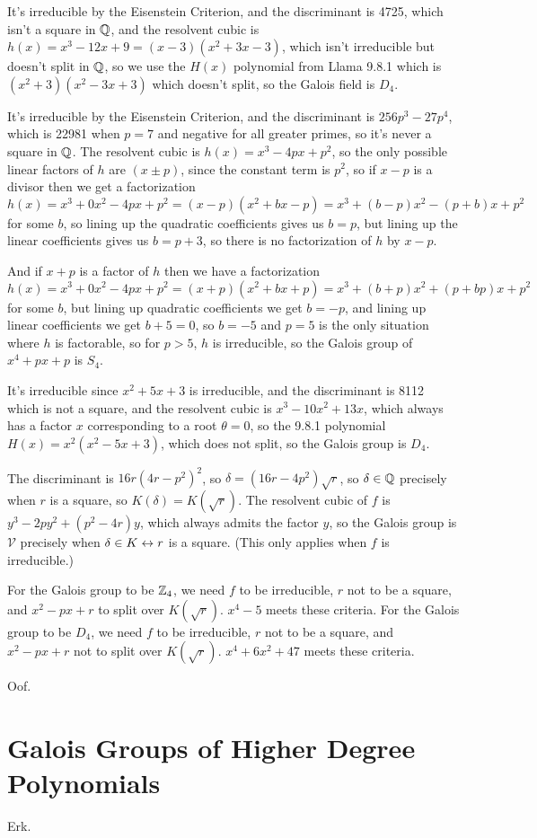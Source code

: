 \documentclass[11pt, oneside]{article}   	%
\begin{document}
\item It's irreducible by the Eisenstein Criterion, and the discriminant is 4725, which isn't a square in $\mathbb{Q}$, and the resolvent cubic is $h(x) = x^3 - 12x + 9 = (x-3)(x^2 + 3x - 3)$, which isn't irreducible but doesn't split in $\mathbb{Q}$, so we use the $H(x)$ polynomial from Llama 9.8.1 which is $(x^2 + 3)(x^2 - 3x + 3)$ which doesn't split, so the Galois field is $D_4$. 
\item It's irreducible by the Eisenstein Criterion, and the discriminant is $256p^3 - 27p^4$, which is 22981 when $p=7$ and negative for all greater primes, so it's never a square in $\mathbb{Q}$. The resolvent cubic is $h(x) = x^3 - 4px + p^2$, so the only possible linear factors of $h$ are $(x \pm p)$, since the constant term is $p^2$, so if $x-p$ is a divisor then we get a factorization $h(x) = x^3 + 0x^2 - 4px + p^2 = (x-p)(x^2 + bx - p) = x^3 + (b-p)x^2 - (p+b)x + p^2$ for some $b$, so lining up the quadratic coefficients gives us $b = p$, but lining up the linear coefficients gives us $b = p + 3$, so there is no factorization of $h$ by $x-p$.

And if $x+p$ is a factor of $h$ then we have a factorization $h(x) = x^3 + 0x^2 - 4px + p^2 = (x+p)(x^2 + bx + p) = x^3 + (b+p)x^2 + (p+bp)x + p^2$ for some $b$, but lining up quadratic coefficients we get $b = -p$, and lining up linear coefficients we get $b + 5 = 0$, so $b = -5$ and $p=5$ is the only situation where $h$ is factorable, so for $p > 5$, $h$ is irreducible, so the Galois group of $x^4 + px + p$ is $S_4$. 
\item It's irreducible since $x^2 + 5x + 3$ is irreducible, and the discriminant is 8112 which is not a square, and the resolvent cubic is $x^3 - 10x^2 + 13x$, which always has a factor $x$ corresponding to a root $\theta = 0$, so the 9.8.1 polynomial $H(x) = x^2(x^2 - 5x + 3)$, which does not split, so the Galois group is $D_4$.
\item The discriminant is $16r(4r-p^2)^2$, so $\delta = (16r-4p^2)\sqrt{r}$, so $\delta \in \mathbb{Q}$ precisely when $r$ is a square, so $K(\delta) = K(\sqrt{r})$. The resolvent cubic of $f$ is $y^3 - 2py^2 + (p^2-4r)y$, which always admits the factor $y$, so the Galois group is $\mathcal{V}$ precisely when $\delta \in K \leftrightarrow r$ is a square. (This only applies when $f$ is irreducible.)
\item For the Galois group to be $\mathbb{Z}_4$, we need $f$ to be irreducible, $r$ not to be a square, and $x^2 - px + r$ to split over $K(\sqrt{r})$. $x^4 - 5$ meets these criteria. For the Galois group to be $D_4$, we need $f$ to be irreducible, $r$ not to be a square, and $x^2 - px + r$ not to split over $K(\sqrt{r})$. $x^4 + 6x^2 + 47$ meets these criteria.
\item Oof.
\ee
\section{Galois Groups of Higher Degree Polynomials}
\be
\item Erk.
\ee
\end{document}
